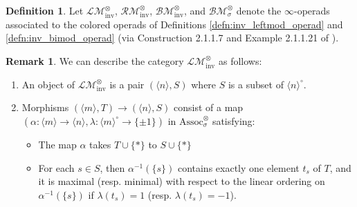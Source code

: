 \documentclass{article}
\newcommand{\Associnv}{\mathrm{Assoc}_\sigma}
\theoremstyle{definition}
\newtheorem{definition}[equation]{Definition}
\newtheorem{remark}[equation]{Remark}
\begin{document}
\begin{definition}\label{defn:inv_leftrightbimod_infty_operad}
    Let $ \mathcal{LM}_\mathrm{inv}^\otimes $, $ \mathcal{RM}_\mathrm{inv}^\otimes $, $ \mathcal{BM}_\mathrm{inv}^\otimes $, and $ \mathcal{BM}_\sigma^\otimes $ denote the $ \infty $-operads associated to the colored operads of Definitions \ref{defn:inv_leftmod_operad} and \ref{defn:inv_bimod_operad} (via Construction 2.1.1.7 and Example 2.1.1.21 of \cite{LurHA}).
\end{definition}
\begin{remark}
    We can describe the category $ \mathcal{LM}_\mathrm{inv}^\otimes $ as follows: 
    \begin{enumerate}[label=(\arabic*)]
        \item An object of $ \mathcal{LM}_\mathrm{inv}^\otimes $ is a pair $ (\langle n\rangle,S) $ where $ S $ is a subset of $ \langle n \rangle^\circ $. 
        \item Morphisms $ (\langle m \rangle, T) \to (\langle n \rangle,S) $ consist of a map $ (\alpha \colon \langle m \rangle \to \langle n \rangle, \lambda \colon \langle m \rangle^\circ \to \{\pm 1\}) $ in $ \Associnv^\otimes $ satisfying: 
        \begin{itemize}
            \item The map $ \alpha $ takes $ T \cup \{*\} $ to $ S \cup \{*\} $
            \item For each $ s \in S $, then $ \alpha^{-1}(\{s\}) $ contains exactly one element $ t_s $ of $ T $, and it is maximal (resp. minimal) with respect to the linear ordering on $ \alpha^{-1}(\{s\}) $ if $ \lambda (t_s) = 1 $ (resp. $ \lambda(t_s) = -1 $). 
        \end{itemize}
    \end{enumerate}
\end{remark}
\end{document}
